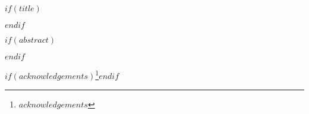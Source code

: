 
\begin{frontmatter}
$if(title)$
\maketitle
$endif$


$if(abstract)$
\begin{abstract}
$abstract$
\end{abstract}
$endif$

$if(acknowledgements)$\thanks{$acknowledgements$}$endif$

\end{frontmatter}


